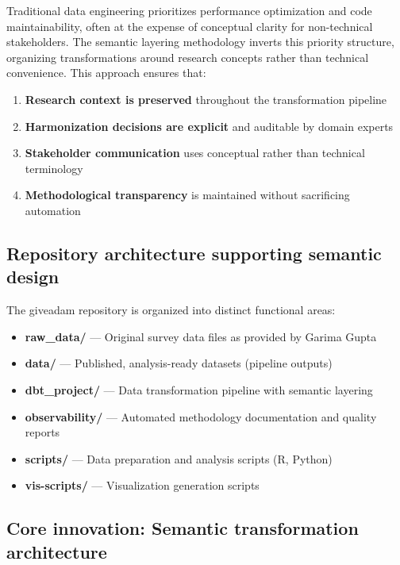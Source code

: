 \documentclass{article}
\begin{document}
Traditional data engineering prioritizes performance optimization and code maintainability, often at the expense of conceptual clarity for non-technical stakeholders. The semantic layering methodology inverts this priority structure, organizing transformations around research concepts rather than technical convenience. This approach ensures that:

\begin{enumerate}
    \item \textbf{Research context is preserved} throughout the transformation pipeline
    \item \textbf{Harmonization decisions are explicit} and auditable by domain experts  
    \item \textbf{Stakeholder communication} uses conceptual rather than technical terminology
    \item \textbf{Methodological transparency} is maintained without sacrificing automation
\end{enumerate}

\subsection{Repository architecture supporting semantic design}
\label{sec:repository-arch}

The giveadam repository is organized into distinct functional areas:

\begin{itemize}
    \item \textbf{raw\_data/} — Original survey data files as provided by Garima Gupta
    \item \textbf{data/} — Published, analysis-ready datasets (pipeline outputs)
    \item \textbf{dbt\_project/} — Data transformation pipeline with semantic layering
    \item \textbf{observability/} — Automated methodology documentation and quality reports
    \item \textbf{scripts/} — Data preparation and analysis scripts (R, Python)
    \item \textbf{vis-scripts/} — Visualization generation scripts
\end{itemize}

\subsection{Core innovation: Semantic transformation architecture}
\label{subsec:core-innovation}
\end{document}
